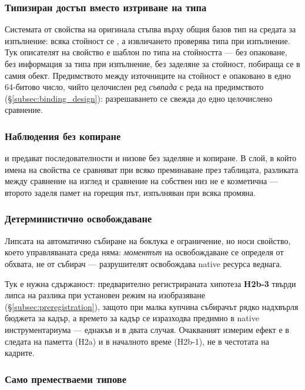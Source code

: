 \subsubsection{Типизиран достъп вместо изтриване на типа}

Системата от свойства на оригинала стъпва върху общия базов тип на средата за изпълнение:
всяка стойност се , а извличането проверява типа при изпълнение. Тук
описателят на свойство е шаблон по типа на стойността --- без опаковане, без информация за
типа при изпълнение, без заделяне за стойност, побираща се в самия обект.
Предимството между източниците на стойност е опаковано в едно 64-битово число, чийто
целочислен ред \emph{съвпада} с реда на предимството (§\ref{subsec:binding_design}):
разрешаването се свежда до едно целочислено сравнение.

\subsubsection{Наблюдения без копиране}

 и  предават последователности и низове без
заделяне и копиране. В слой, в който имена на свойства се сравняват при всяко преминаване
през таблицата, разликата между сравнение на изглед и сравнение на собствен низ не е
козметична --- второто заделя памет на горещия път, изпълняван при всяка промяна.

\subsubsection{Детерминистично освобождаване}

Липсата на автоматично събиране на боклука е ограничение, но носи свойство, което
управляваната среда няма: \emph{моментът} на освобождаване се определя от обхвата, не от
събирач --- разрушителят освобождава native ресурса веднага.

Тук е нужна сдържаност: предварително регистрираната хипотеза \textbf{H2b-3} твърди липса
на разлика при установен режим на изобразяване (§\ref{subsec:preregistration}), защото при
малка купчина събирачът рядко надхвърля бюджета за кадър, а времето за кадър се изразходва
предимно в native инструментариума --- еднакъв и в двата случая. Очакваният измерим ефект е
в следата на паметта (H2a) и в началното време (H2b-1), не в честотата на кадрите.

\subsubsection{Само преместваеми типове}

